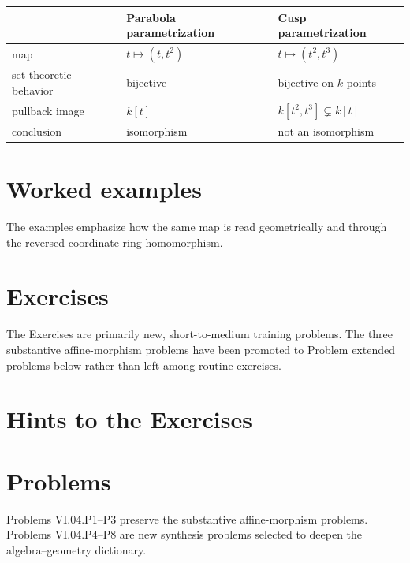 \begin{center}
\begin{tabular}{@{}lll@{}}
\toprule
& \textbf{Parabola parametrization} & \textbf{Cusp parametrization}\\
\midrule
map & \(t\mapsto(t,t^2)\) & \(t\mapsto(t^2,t^3)\)\\
set-theoretic behavior & bijective & bijective on \(k\)-points\\
pullback image & \(k[t]\) & \(k[t^2,t^3]\subsetneq k[t]\)\\
conclusion & isomorphism & not an isomorphism\\
\bottomrule
\end{tabular}
\end{center}

\section{Worked examples}
\label{sec:vi04-worked-examples}
The examples emphasize how the same map is read geometrically and through the reversed
coordinate-ring homomorphism.


\section{Exercises}
\label{sec:vi04-exercises}
The Exercises are primarily new, short-to-medium training problems.  The three substantive
affine-morphism problems have been promoted to Problem extended problems below rather than
left among routine exercises.


\ifdefined\IncludeExerciseHints
\section{Hints to the Exercises}
\label{sec:vi04-exercise-hints}

\fi

\section{Problems}
\label{sec:vi04-problems}
Problems VI.04.P1--P3 preserve the substantive affine-morphism problems.  Problems
VI.04.P4--P8 are new synthesis problems selected to deepen the algebra--geometry dictionary.


